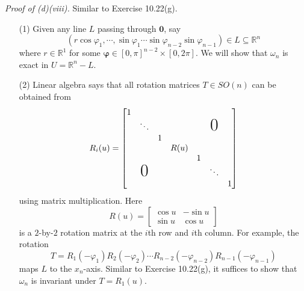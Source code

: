 \documentclass{article}
\begin{document}
\emph{Proof of (d)(viii).}
Similar to Exercise 10.22(g).
\begin{enumerate}
\item[(1)]
  Given any line $L$ passing through $\mathbf{0}$,
  say
  \[
    (r \cos\varphi_1, \cdots, \sin\varphi_1 \cdots \sin\varphi_{n-2} \sin\varphi_{n-1})
    \in L
    \subseteq \mathbb{R}^n
  \]
  where $r \in \mathbb{R}^1$
  for some $\bm{\varphi} \in [0,\pi]^{n-2} \times [0,2\pi]$.
  We will show that $\omega_n$ is exact in $U = \mathbb{R}^n - L$.

\item[(2)]
  Linear algebra says that all rotation matrices $T \in SO(n)$ can be obtained from
  \[
    R_i(u) = \begin{bmatrix}
      1 &               &   &      &   &               &   \\
        &        \ddots &   &      &   & \text{\huge0} &   \\
        &               & 1 &      &   &               &   \\
        &               &   & R(u) &   &               &   \\
        &               &   &      & 1 &               &   \\
        & \text{\huge0} &   &      &   &        \ddots &   \\
        &               &   &      &   &               & 1
    \end{bmatrix}
  \]
  using matrix multiplication.
  Here
  \[
    R(u) =
    \begin{bmatrix}
      \cos u & -\sin u \\
      \sin u &  \cos u
    \end{bmatrix}
  \]
  is a $2$-by-$2$ rotation matrix at the $i$th row and $i$th column.
  For example, the rotation
  \[
    T
    = R_1(-\varphi_1) R_2(-\varphi_2) \cdots
      R_{n-2}(-\varphi_{n-2}) R_{n-1}(-\varphi_{n-1})
  \]
  maps $L$ to the $x_n$-axis.
  Similar to Exercise 10.22(g), it suffices to show that $\omega_n$ is invariant under $T = R_1(u)$.


\end{enumerate}
\end{document}
